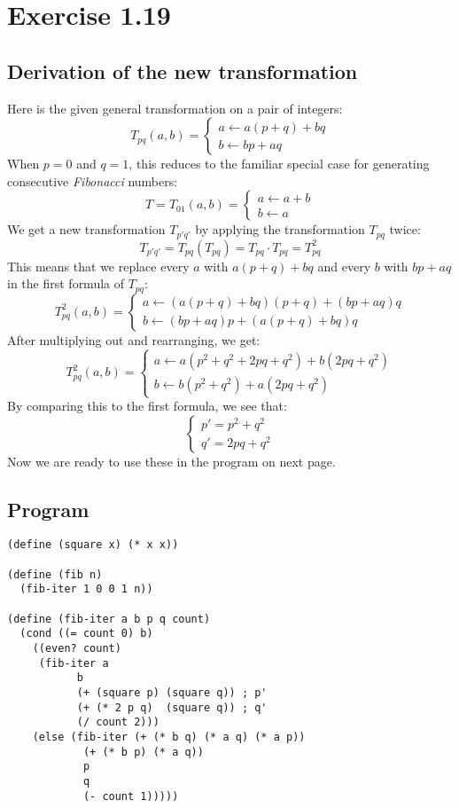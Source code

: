 \documentclass{article}
\begin{document}
\section*{Exercise 1.19}

\subsection*{Derivation of the new transformation}

Here is the given general transformation on a pair of integers:
$$  T_{pq}(a, b) = 
\begin{cases} 
    a \gets a(p + q) + bq \\
    b \gets bp + aq
\end{cases} $$
When $p = 0$ and $q = 1$, this reduces to the familiar special case for 
generating consecutive \emph{Fibonacci} numbers:
$$ T = T_{01}(a, b) = 
\begin{cases} 
    a \gets a + b \\
    b \gets a
\end{cases} $$
We get a new transformation $T_{p'q'}$ by applying the transformation $T_{pq}$ 
twice:
$$ T_{p'q'} = T_{pq}(T_{pq}) = T_{pq} \cdot T_{pq} = T_{pq}^2 $$
This means that we replace every $a$ with $a(p + q) + bq$ and every $b$ 
with $bp + aq$ in the first formula of $T_{pq}$: 
$$  T_{pq}^2(a, b) = 
\begin{cases} 
    a \gets (a(p + q) + bq)(p + q) + (bp + aq)q \\
    b \gets (bp + aq)p + (a(p + q) + bq)q
\end{cases} $$
After multiplying out and rearranging, we get:
$$  T_{pq}^2(a, b) = 
\begin{cases} 
    a \gets a(p^2 + q^2 + 2pq + q^2) + b(2pq + q^2) \\
    b \gets b(p^2 + q^2) + a(2pq + q^2)
\end{cases} $$
By comparing this to the first formula, we see that:
$$ \begin{cases} 
  p' = p^2 + q^2 \\
  q' = 2pq + q^2
\end{cases} $$
Now we are ready to use these in the program on next page.

\newpage
\subsection*{Program}

\begin{Verbatim}
(define (square x) (* x x))

(define (fib n)
  (fib-iter 1 0 0 1 n))

(define (fib-iter a b p q count)
  (cond ((= count 0) b)
	((even? count)
	 (fib-iter a
		   b
		   (+ (square p) (square q)) ; p'
		   (+ (* 2 p q)  (square q)) ; q'
		   (/ count 2)))
	(else (fib-iter (+ (* b q) (* a q) (* a p))
			(+ (* b p) (* a q))
			p
			q
			(- count 1)))))
\end{Verbatim}
\end{document}
